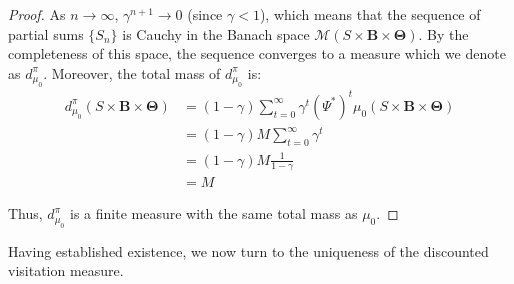 \documentclass[a4paper,12pt]{report}
\begin{document}
\begin{proof}
    As $n \to \infty$, $\gamma^{n+1}\to 0$ (since $\gamma < 1$), which means that
    the sequence of partial sums $\{S_{n}\}$ is Cauchy in the Banach space
    $\mathcal{M}(S \times \boldsymbol{B}\times \boldsymbol{\Theta})$. By the completeness
    of this space, the sequence converges to a measure which we denote as
    $d^{\pi}_{\mu_0}$. Moreover, the total mass of $d^{\pi}_{\mu_0}$ is:
    \begin{align}
        d^{\pi}_{\mu_0}(S \times \boldsymbol{B}\times \boldsymbol{\Theta}) & = (1-\gamma) \sum_{t=0}^{\infty}\gamma^{t} (\Psi^{*})^{t} \mu_{0}(S \times \boldsymbol{B}\times \boldsymbol{\Theta}) \\
                                                                           & = (1-\gamma) M \sum_{t=0}^{\infty}\gamma^{t}                                                                         \\
                                                                           & = (1-\gamma) M \frac{1}{1-\gamma}                                                                                    \\
                                                                           & = M
    \end{align}

    Thus, $d^{\pi}_{\mu_0}$ is a finite measure with the same total mass as $\mu_{0}$.
\end{proof}Having established existence, we now turn to the uniqueness of the discounted
visitation measure.
\end{document}
